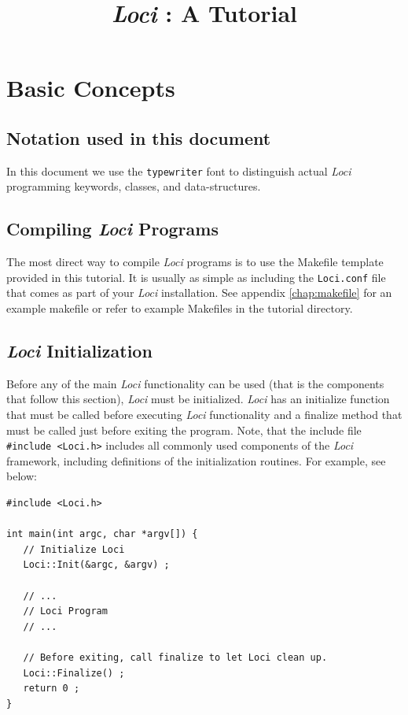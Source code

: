 \documentclass[10pt,epsf,letterpaper,twoside]{book}
\title { {\it Loci} : A Tutorial }
\begin{document}
\maketitle
\tableofcontents

\cleardoublepage
\setcounter{page}{1}



\chapter{ Basic Concepts }


\section{Notation used in this document}
In this document we use the {\tt typewriter} font to distinguish
actual {\it Loci} programming keywords, classes, and data-structures.

\section{ Compiling {\it Loci} Programs }

The most direct way to compile {\it Loci} programs is to use the Makefile
template provided in this tutorial.  It is usually as simple as
including the {\tt Loci.conf} file that comes as part of your {\it Loci}
installation.  See appendix \ref{chap:makefile} for an example
makefile or refer to example Makefiles in the tutorial directory.


\section{{\it Loci} Initialization}

Before any of the main {\it Loci} functionality can be used (that is the
components that follow this section), {\it Loci} must be initialized.  {\it Loci}
has an initialize function that must be called before executing {\it Loci}
functionality and a finalize method that must be called just before
exiting the program.  Note, that the include file {\tt \#include
  <Loci.h>} includes all commonly used components of the {\it Loci}
framework, including definitions of the initialization routines.  For
example, see below:
\clearpage
\begin{verbatim}
#include <Loci.h>

int main(int argc, char *argv[]) {
   // Initialize Loci
   Loci::Init(&argc, &argv) ;

   // ...
   // Loci Program
   // ...

   // Before exiting, call finalize to let Loci clean up.
   Loci::Finalize() ;
   return 0 ;
}
\end{verbatim}
\end{document}
